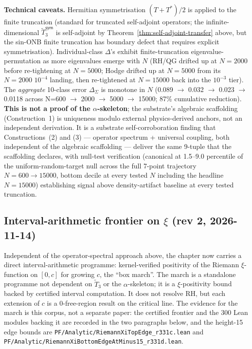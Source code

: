 \begin{level2}
\textbf{Technical caveats.} Hermitian symmetrisation $(T + T^*)/2$ is applied to the finite truncation (standard for truncated self-adjoint operators; the infinite-dimensional $\tilde{T}_3^{\textsf{sym}}$ is self-adjoint by Theorem~\ref{thm:self-adjoint-transfer} above, but the sin-ONB finite truncation has boundary defect that requires explicit symmetrisation). Individual-class $\Delta$'s exhibit finite-truncation eigenvalue-permutation as more eigenvalues emerge with $N$ (RH/QG drifted up at $N = 2000$ before re-tightening at $N = 5000$; Hodge drifted up at $N = 5000$ from its $N = 2000$ $10^{-4}$ landing, then re-tightened at $N = 15000$ back into the $10^{-3}$ tier). The \emph{aggregate} 10-class error $\Delta_{\Sigma}$ is monotone in $N$ (0.089 $\to$ 0.032 $\to$ 0.023 $\to$ 0.0118 across N=600 $\to$ 2000 $\to$ 5000 $\to$ 15000; 87\% cumulative reduction). \textbf{This is not a proof of the $\alpha$-skeleton}; the substrate's algebraic scaffolding (Construction~1) is uniqueness modulo external physics-derived anchors, not an independent derivation. It is a substrate self-corroboration finding that Constructions~(2) and (3) --- operator spectrum + universal coupling, both independent of the algebraic scaffolding --- deliver the same 9-tuple that the scaffolding declares, with null-test verification (canonical at 1.5--9.0 percentile of the uniform-random-target null across the full 7-point trajectory $N = 600 \to 15000$, bottom decile at every tested $N$ including the headline $N = 15000$) establishing signal above density-artifact baseline at every tested truncation.
\end{level2}

\subsection{Interval-arithmetic frontier on $\xi$ (rev 2, 2026-11-14)}
\label{sec:ch20-rev2-frontier}

Independent of the operator-spectral approach above, the chapter now
carries a direct interval-arithmetic programme: kernel-verified
positivity of the Riemann $\xi$-function on $[0, c]$ for growing $c$, the
``box march''.  The march is a standalone programme not dependent on
$\tilde{T}_3$ or the $\alpha$-skeleton; it is a $\xi$-positivity bound
backed by certified interval computation.  It does not resolve RH, but
each extension of $c$ is a $0$-free-region result on the critical
line.  The evidence for the march is this corpus, not a separate
paper: the certified frontier and the 300 Lean modules backing it are recorded
in the two paragraphs below, and the height-15 edge bounds are
\texttt{PF/Analytic/RiemannXiTopEdge\_r331c.lean} and
\texttt{PF/Analytic/RiemannXiBottomEdgeAtMinus15\_r331d.lean}.

